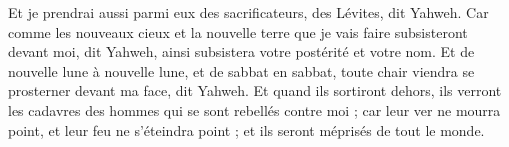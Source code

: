 \begin{multicols}{2}
Et je prendrai aussi parmi eux des sacrificateurs, des Lévites, dit Yahweh.
Car comme les nouveaux cieux et la nouvelle terre que je vais faire subsisteront devant moi, dit Yahweh, ainsi subsistera votre postérité et votre nom.
Et de nouvelle lune à nouvelle lune, et de sabbat en sabbat, toute chair viendra se prosterner devant ma face, dit Yahweh.
Et quand ils sortiront dehors, ils verront les cadavres des hommes qui se sont rebellés contre moi ; car leur ver ne mourra point, et leur feu ne s'éteindra point ; et ils seront méprisés de tout le monde.
\PPE{}
\end{multicols}
